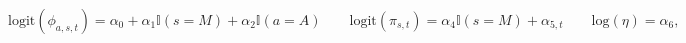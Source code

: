 \begin{equation}
  \text{logit}(\phi_{a, s, t}) = \alpha_{0} + \alpha_{1}\mathbb{I}(s = M) + \alpha_{2}\mathbb{I}(a = A) \qquad
  \text{logit}(\pi_{s, t}) = \alpha_{4} \mathbb{I}(s = M) + \alpha_{5, t} \qquad
  \text{log}(\eta) = \alpha_{6},
  \label{eqn:parameterisation-info}
\end{equation}